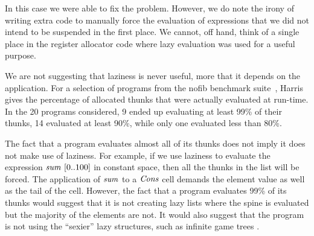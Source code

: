 In this case we were able to fix the problem. However, we do note the irony of writing extra code to manually force the evaluation of expressions that we did not intend to be suspended in the first place. We cannot, off hand, think of a single place in the register allocator code where lazy evaluation was used for a useful purpose. 

We are not suggesting that laziness is never useful, more that it depends on the application. For a selection of programs from the nofib benchmark suite~\cite{partain:nofib}, Harris~\cite{harris:feedback-parallelism} gives the percentage of allocated thunks that were actually evaluated at run-time. In the 20 programs considered, 9 ended up evaluating at least 99\% of their thunks, 14 evaluated at least 90\%, while only one evaluated less than 80\%. 

The fact that a program evaluates almost all of its thunks does not imply it does not make use of laziness. For example, if we use laziness to evaluate the expression $\isum \ [0..100]$ in constant space, then all the thunks in the list will be forced. The application of $\operatorname{\mathit{sum}}$ to a $\operatorname{\mathit{Cons}}$ cell demands the element value as well as the tail of the cell. However, the fact that a program evaluates 99\% of its thunks would suggest that it is not creating lazy lists where the spine is evaluated but the majority of the elements are not. It would also suggest that the program is not using the ``sexier'' lazy structures, such as infinite game trees \cite{hughes:fp-matters}. 




